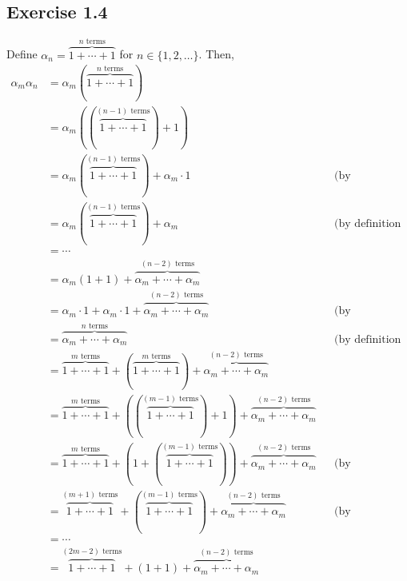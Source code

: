 \documentclass{article}
\theoremstyle{thmstyleone}
\theoremstyle{thmstyletwo}
\theoremstyle{thmstylethree}
\begin{document}
\let\rem\undefined
\let\Zm\undefined

\subsection{Exercise 1.4}
\newcommand\F{\mathfrak F}
Define $\alpha_n = \overbrace{1 + \cdots + 1}^\text{$n$ terms}$ for $n \in \{1, 2, \ldots\}$.
Then, \begin{align*}
  \alpha_m\alpha_n
  &= \alpha_m(\overbrace{1 + \dotsb + 1}^\text{$n$ terms}) \\
  &= \alpha_m((\overbrace{1+ \dotsb + 1}^\text{$(n-1)$ terms}) + 1)\\
  &= \alpha_m(\overbrace{1 + \dotsb + 1}^\text{$(n-1)$ terms}) + \alpha_m \cdot 1 && \text{(by distributive law)}\\
  &= \alpha_m(\overbrace{1 + \dotsb + 1}^\text{$(n-1)$ terms}) + \alpha_m && \text{(by definition of multiplicative identity)}\\
  &= \dotsb \\
  &= \alpha_m(1 + 1) + \overbrace{\alpha_m + \dotsb + \alpha_m}^\text{$(n-2)$ terms}\\
  &= \alpha_m \cdot 1 + \alpha_m \cdot 1 + \overbrace{\alpha_m + \dotsb + \alpha_m}^\text{$(n-2)$ terms} && \text{(by distributive law)} \\
  &= \overbrace{\alpha_m + \dotsb + \alpha_m}^\text{$n$ terms} && \text{(by definition of multiplicative identity)} \\
  &= \overbrace{1 + \dotsb + 1}^\text{$m$ terms} + (\overbrace{1 + \dotsb + 1}^\text{$m$ terms}) + \overbrace{\alpha_m + \dotsb + \alpha_m}^\text{$(n-2)$ terms} \\
  &= \overbrace{1 + \dotsb + 1}^\text{$m$ terms} + ((\overbrace{1 + \dotsb + 1}^\text{$(m-1)$ terms}) + 1) + \overbrace{\alpha_m + \dotsb + \alpha_m}^\text{$(n-2)$ terms} \\
  &= \overbrace{1 + \dotsb + 1}^\text{$m$ terms} + (1 + (\overbrace{1 + \dotsb + 1}^\text{$(m-1)$ terms})) + \overbrace{\alpha_m + \dotsb + \alpha_m}^\text{$(n-2)$ terms} && \text{(by commutative property)}\\
  &= \overbrace{1 + \dotsb + 1}^\text{$(m+1)$ terms} + (\overbrace{1 + \dotsb + 1}^\text{$(m-1)$ terms}) + \overbrace{\alpha_m + \dotsb + \alpha_m}^\text{$(n-2)$ terms} && \text{(by associative property)}  \\
  &= \dotsb \\
  &= \overbrace{1 + \dotsb + 1}^\text{$(2m-2)$ terms} + (1 + 1) + \overbrace{\alpha_m + \dotsb + \alpha_m}^\text{$(n-2)$ terms} \\

\end{align*}
\end{document}
